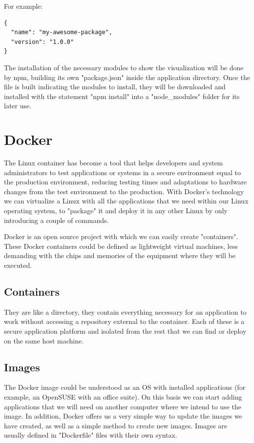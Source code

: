 \documentclass[a4paper, 12pt]{book}
\begin{document}
For example:
\begin{lstlisting}[frame=single]
{
  "name": "my-awesome-package",
  "version": "1.0.0"
}
\end{lstlisting}

The installation of the necessary modules to show the visualization will be done by npm, building its own "package.json" inside the application directory.  Once the file is built indicating the modules to install, they will be downloaded and installed with the statement "npm install" into a "node\_modules" folder for its later use.

\section{Docker}
\label{sec:docker}
The Linux container has become a tool that helps developers and system administrators to test applications or systems in a secure environment equal to the production environment, reducing testing times and adaptations to hardware changes from the test environment to the production. With Docker's technology we can virtualize a Linux with all the applications that we need within our Linux operating system, to "package" it and deploy it in any other Linux by only introducing a couple of commands.

Docker is an open source project with which we can easily create "containers". These Docker containers could be defined as lightweight virtual machines, less demanding with the chips and memories of the equipment where they will be executed.

\subsection{Containers}

They are like a directory, they contain everything necessary for an application to work without accessing a repository external to the container. Each of these is a secure application platform and isolated from the rest that we can find or deploy on the same host machine.


\subsection{Images}

The Docker image could be understood as an OS with installed applications (for example, an OpenSUSE with an office suite). On this basis we can start adding applications that we will need on another computer where we intend to use the image. In addition, Docker offers us a very simple way to update the images we have created, as well as a simple method to create new images. Images are usually defined in "Dockerfile" files with their own syntax.
\end{document}
